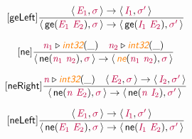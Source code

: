 \documentclass[10pt,leqno,fleqn]{article}
\newcommand{\artVariable}[1]{\mbox{\color{purple}\em #1\/}}
\newcommand{\artConstructor}[1]{\mbox{\sf #1}}
\newcommand{\artSpecial}[1]{\mbox{\color{orange}\sf\em #1}}
\begin{document}
\begin{equation}
\tag*{[\artConstructor{\sf geLeft}]}
\begin{split}\frac{\langle\, \artVariable{E$_{1}$}, \artVariable{$\sigma$}\,\rangle \rightarrow \langle\, \artVariable{I$_{1}$}, \artVariable{$\sigma$\/$^\prime$}\,\rangle }{\langle\, \artConstructor{\sf ge}(\artVariable{E$_{1}$}\ \artVariable{E$_{2}$}), \artVariable{$\sigma$}\,\rangle \rightarrow \langle\, \artConstructor{\sf ge}(\artVariable{I$_{1}$}\ \artVariable{E$_{2}$}), \artVariable{$\sigma$\/$^\prime$}\,\rangle }
\end{split}
\end{equation}

\begin{equation}
\tag*{[\artConstructor{\sf ne}]}
\begin{split}\frac{ \artVariable{n$_{1}$}\triangleright \artSpecial{int32}(\_) \quad  \artVariable{n$_{2}$}\triangleright \artSpecial{int32}(\_) }{\langle\, \artConstructor{\sf ne}(\artVariable{n$_{1}$}\ \artVariable{n$_{2}$}), \artVariable{$\sigma$}\,\rangle \rightarrow \langle\, \artSpecial{ne}(\artVariable{n$_{1}$}\ \artVariable{n$_{2}$}), \artVariable{$\sigma$}\,\rangle }
\end{split}
\end{equation}

\begin{equation}
\tag*{[\artConstructor{\sf neRight}]}
\begin{split}\frac{ \artVariable{n}\triangleright \artSpecial{int32}(\_) \quad \langle\, \artVariable{E$_{2}$}, \artVariable{$\sigma$}\,\rangle \rightarrow \langle\, \artVariable{I$_{2}$}, \artVariable{$\sigma$\/$^\prime$}\,\rangle }{\langle\, \artConstructor{\sf ne}(\artVariable{n}\ \artVariable{E$_{2}$}), \artVariable{$\sigma$}\,\rangle \rightarrow \langle\, \artConstructor{\sf ne}(\artVariable{n}\ \artVariable{I$_{2}$}), \artVariable{$\sigma$\/$^\prime$}\,\rangle }
\end{split}
\end{equation}

\begin{equation}
\tag*{[\artConstructor{\sf neLeft}]}
\begin{split}\frac{\langle\, \artVariable{E$_{1}$}, \artVariable{$\sigma$}\,\rangle \rightarrow \langle\, \artVariable{I$_{1}$}, \artVariable{$\sigma$\/$^\prime$}\,\rangle }{\langle\, \artConstructor{\sf ne}(\artVariable{E$_{1}$}\ \artVariable{E$_{2}$}), \artVariable{$\sigma$}\,\rangle \rightarrow \langle\, \artConstructor{\sf ne}(\artVariable{I$_{1}$}\ \artVariable{E$_{2}$}), \artVariable{$\sigma$\/$^\prime$}\,\rangle }
\end{split}
\end{equation}
\end{document}
